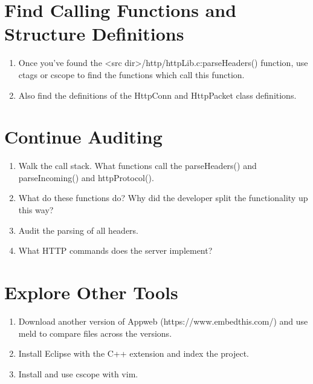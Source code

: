 \documentclass[12pt]{Training}
\begin{document}
\section*{Find Calling Functions and Structure Definitions}
\begin{enumerate}
    \item Once you've found the <src dir>/http/httpLib.c:parseHeaders() function, use ctags or cscope to find the functions which call this function.
    \item Also find the definitions of the HttpConn and HttpPacket class definitions.
\end{enumerate}

\section*{Continue Auditing}
\begin{enumerate}
    \item Walk the call stack. What functions call the parseHeaders() and parseIncoming() and httpProtocol().
    \item What do these functions do? Why did the developer split the functionality up this way?
    \item Audit the parsing of all headers.
    \item What HTTP commands does the server implement?
\end{enumerate}

\section*{Explore Other Tools}
\begin{enumerate}
    \item Download another version of Appweb (https://www.embedthis.com/) and use meld to compare files across the versions.
    \item Install Eclipse with the C++ extension and index the project.
    \item Install and use cscope with vim.
\end{enumerate}
\end{document}
